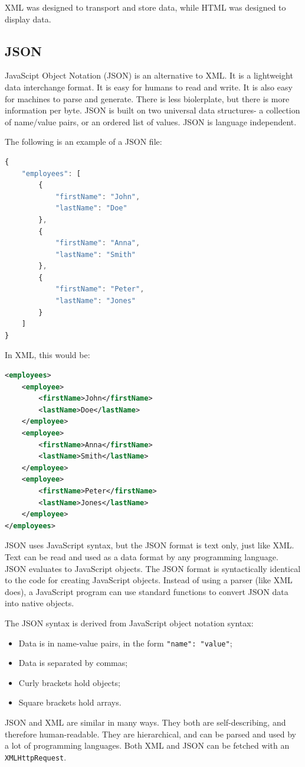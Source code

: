\documentclass[a4paper, openany]{memoir}
\begin{document}
\noindent XML was designed to transport and store data, while HTML was designed to display data.

\subsection{JSON}
JavaScipt Object Notation (JSON) is an alternative to XML. It is a lightweight data interchange format. It is easy for humans to read and write. It is also easy for machines to parse and generate. There is less biolerplate, but there is more information per byte. JSON is built on two universal data structures- a collection of name/value pairs, or an ordered list of values. JSON is language independent.

\noindent The following is an example of a JSON file:
\begin{lstlisting}[language=javascript]
{
    "employees": [
        {
            "firstName": "John",
            "lastName": "Doe"
        },
        {
            "firstName": "Anna",
            "lastName": "Smith"
        },
        {
            "firstName": "Peter",
            "lastName": "Jones"
        }
    ]
}
\end{lstlisting}
In XML, this would be:
\begin{lstlisting}[language=xml]
<employees>
    <employee>
        <firstName>John</firstName>
        <lastName>Doe</lastName>
    </employee>
    <employee>
        <firstName>Anna</firstName>
        <lastName>Smith</lastName>
    </employee>
    <employee>
        <firstName>Peter</firstName>
        <lastName>Jones</lastName>
    </employee>
</employees>
\end{lstlisting}
JSON uses JavaScript syntax, but the JSON format is text only, just like XML. Text can be read and used as a data format by any programming language. JSON evaluates to JavaScript objects. The JSON format is syntactically identical to the code for creating JavaScript objects. Instead of using a parser (like XML does), a JavaScript program can use standard functions to convert JSON data into native objects.

\noindent The JSON syntax is derived from JavaScript object notation syntax:
\begin{itemize}
    \item Data is in name-value pairs, in the form \texttt{"name": "value"};
    \item Data is separated by commas;
    \item Curly brackets hold objects;
    \item Square brackets hold arrays.
\end{itemize}
JSON and XML are similar in many ways. They both are self-describing, and therefore human-readable. They are hierarchical, and can be parsed and used by a lot of programming languages. Both XML and JSON can be fetched with an \texttt{XMLHttpRequest}.
\end{document}
